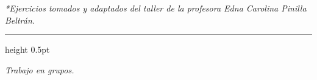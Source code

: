 \documentclass[11pt, letterpaper]{article}
\begin{document}
	\vfill
	\noindent
	\begin{center}
		\small\textit{*Ejercicios tomados y adaptados del taller de la profesora Edna Carolina Pinilla Beltrán.}
	\end{center}
	
	\vspace{0.5cm}
	{\color{UnalGreen}\hrule height 0.5pt}
	\begin{center}
		\small 
		\textit{Trabajo en grupos.}
	\end{center}
	
\end{document}
